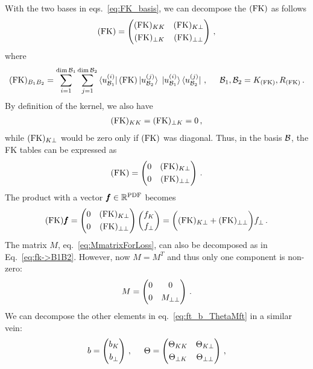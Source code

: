 With the two bases in eqs.~\eqref{eq:FK_basis}, we can decompose the $(\mathrm{FK})$ as follows
\begin{equation}
  (\mathrm{FK}) =
  \begin{pmatrix}
    (\mathrm{FK})_{KK}     & (\mathrm{FK})_{K\bot} \\[3pt]
    (\mathrm{FK})_{\bot K} & (\mathrm{FK})_{\bot\bot}
  \end{pmatrix} \,,
\end{equation}
where
\begin{align}
  (\mathrm{FK})_{B_1 B_2} = \sum_{i=1}^{\dim\mathcal{B}_1} \sum_{j=1}^{\dim\mathcal{B}_2}
  \bra{u_{\mathcal{B}_1}^{(i)}} (\mathrm{FK}) \ket{u_{\mathcal{B}_2}^{(j)}} \;
  \ket{u_{\mathcal{B}_1}^{(i)}} \bra{u_{\mathcal{B}_2}^{(j)}}\,,
  \hspace{5mm}
  \mathcal{B}_1, \mathcal{B}_2 = K_{(\mathrm{FK})}, R_{(\mathrm{FK})}\,.
  \label{eq:fk->B1B2}
\end{align}
By definition of the kernel, we also have
\begin{align}
  (\mathrm{FK})_{KK} = (\mathrm{FK})_{\bot K} = 0 \,,
\end{align}
while $(\mathrm{FK})_{K\bot}$ would be zero only if $(\mathrm{FK})$ was diagonal. Thus, in the basis
$\mathcal{B}$, the FK tables can be expressed as
\begin{align}
  (\mathrm{FK}) =
  \begin{pmatrix}
    0  & (\mathrm{FK})_{K\bot} \\[3pt]
    0 & (\mathrm{FK})_{\bot\bot}
  \end{pmatrix} \,.
\end{align}
The product with a vector $\pmb{f} \in \mathbb{R}^{\textrm{PDF}}$ becomes
\begin{equation}
  (\mathrm{FK}) \pmb{f} =
    \begin{pmatrix}
      0  & (\mathrm{FK})_{K\bot} \\[3pt]
      0  & (\mathrm{FK})_{\bot\bot}
    \end{pmatrix}
    \begin{pmatrix} 
      f_K \\[2pt]
      f_{\bot}
    \end{pmatrix}
    = \biggl((\mathrm{FK})_{K\bot} + (\mathrm{FK})_{\bot\bot}\biggr) f_{\bot} \,.
\end{equation}
The matrix $M$, eq.~\eqref{eq:MmatrixForLoss}, can also be decomposed as in Eq.~\eqref{eq:fk->B1B2}. However, now
$M=M^T$ and thus only one component is non-zero:
\begin{align}
  M =
  \begin{pmatrix}
    0 & 0 \\[3pt]
    0 & M_{\bot\bot}
  \end{pmatrix} \,.
  \label{eq:fk_projection_basis}
\end{align}
We can decompose the other elements in eq.~\eqref{eq:ft_b_ThetaMft} in a similar vein:
\begin{align}
  b = \begin{pmatrix} b_{K} \\[3pt] b_{\bot} \end{pmatrix} \,,
  \hspace{5mm}
  \Theta = \begin{pmatrix}
    \Theta_{KK} & \Theta_{K\bot} \\[3pt]
    \Theta_{\bot K} & \Theta_{\bot\bot}
  \end{pmatrix} \,,
\end{align}
